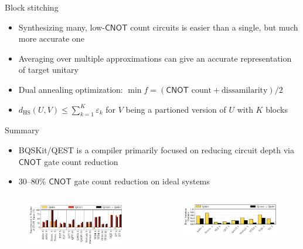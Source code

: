 \documentclass[11pt,aspectratio=1610,xcolor=dvipsnames]{beamer}
\begin{document}
\begin{frame}{Block stitching}
	\begin{itemize}
		\item Synthesizing many, low-$\mathsf{CNOT}$ count circuits is easier than a single, but much more accurate one
		\item Averaging over multiple approximations can give an accurate representation of target unitary
		\item Dual annealing optimization: $\min f = (\mathsf{CNOT} \text{ count} + \text{dissamilarity})/2$
		\item $d_\text{HS}(U, V) \leq \sum_{k = 1}^K \varepsilon_k$ for $V$ being a partioned version of $U$ with $K$ blocks
	\end{itemize}
\end{frame}

\begin{frame}{Summary}
	\begin{itemize}
		\item BQSKit/QEST is a compiler primarily focused on reducing circuit depth via $\mathsf{CNOT}$ gate count reduction
		\item 30--80\% $\mathsf{CNOT}$ gate count reduction on ideal systems
	\end{itemize}
	\begin{columns}
		\begin{figure}[h]
			\centering
			\includegraphics[width=\textwidth]{reductions.png}
		\end{figure}
		\begin{figure}[h]
			\centering
			\includegraphics[width=\textwidth]{tvd-reductions.png}
		\end{figure}
	\end{columns}
\end{frame}
\end{document}
